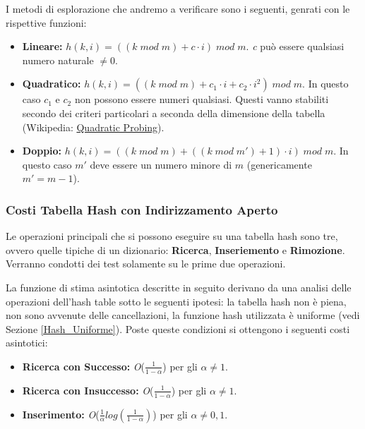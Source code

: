 \documentclass{article}
\newcommand{\bigO}{\emph{O}}
\begin{document}
I metodi di esplorazione che andremo a verificare sono i seguenti, genrati con le rispettive funzioni:
\begin{itemize}
\item \textbf{Lineare:} \begin{math} h(k, i) = ((k\; mod\; m) + c \cdot i)\; mod\; m\end{math}. \emph{c} può essere qualsiasi numero naturale $\neq 0$.
\item \textbf{Quadratico:} \begin{math} h(k, i) = ((k\; mod\; m) + c_1 \cdot i + c_2 \cdot i ^ 2)\; mod\; m\end{math}. In questo caso $c_1$ e $c_2$ non possono essere numeri qualsiasi. Questi vanno stabiliti secondo dei criteri particolari a seconda della dimensione della tabella (\label{Esplorazione_Quadratica}Wikipedia: \href{https://en.wikipedia.org/wiki/Quadratic_probing}{Quadratic Probing}).
\item \textbf{Doppio:} \begin{math} h(k, i) = ((k\; mod\; m) + ((k\; mod\; m') + 1) \cdot i)\; mod\; m\end{math}. In questo caso $m'$ deve essere un numero minore di $m$ (genericamente $m' = m - 1$). 
\end{itemize}

\subsubsection{Costi Tabella Hash con Indirizzamento Aperto}
Le operazioni principali che si possono eseguire su una tabella hash sono tre, ovvero quelle tipiche di un dizionario: \textbf{Ricerca}, \textbf{Inseriemento} e \textbf{Rimozione}.
\break
Verranno condotti dei test solamente su le prime due operazioni.

La funzione di stima asintotica descritte in seguito derivano da una analisi delle operazioni dell'hash table sotto le seguenti ipotesi: la tabella hash non è piena, non sono avvenute delle cancellazioni, la funzione hash  utilizzata è uniforme (vedi Sezione \ref{Hash_Uniforme}). \hfill
\break
Poste queste condizioni si ottengono i seguenti costi asintotici:
\begin{itemize}
\item \textbf{Ricerca con Successo:} \bigO ($\frac{1}{1 - \alpha} $) per gli $\alpha \neq 1$.
\item \textbf{Ricerca con Insuccesso:} \bigO ($\frac{1}{1 - \alpha} $) per gli $\alpha \neq 1$.
\item \textbf{Inserimento:} \bigO ($\frac{1}{\alpha} log(\frac{1}{1 - \alpha})$) per gli $\alpha \neq 0,1$.

\end{itemize}
\end{document}
